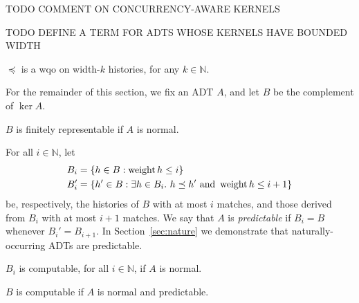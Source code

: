 TODO COMMENT ON CONCURRENCY-AWARE KERNELS

TODO DEFINE A TERM FOR ADTS WHOSE KERNELS HAVE BOUNDED WIDTH

\begin{lemma}

  $\preceq$ is a wqo on width-$k$ histories, for any $k \in \mathbb{N}$.

\end{lemma}

For the remainder of this section, we fix an ADT $A$, and let $B$ be the
complement of $\ker A$.

\begin{lemma}

  $B$ is finitely representable if $A$ is normal.

\end{lemma}

For all $i \in \mathbb{N}$, let
\begin{align*}
  B_i &= {\{{ h \in B : \operatorname{weight} h \le i }\}} \\
  B_i' &= {\{{ h' \in B :
    \exists h \in B_i.\ h \preceq h' \text{ and } \operatorname{weight} h \le i+1
  }\}}
\end{align*}
be, respectively, the histories of $B$ with at most $i$ matches, and those
derived from $B_i$ with at most $i\!+\!1$ matches. We say that $A$ is
\emph{predictable} if $B_i = B$ whenever $B_i' = B_{i+1}$. In 
Section~\ref{sec:nature} we demonstrate that naturally-occurring ADTs are
predictable.

\begin{lemma}

  $B_i$ is computable, for all $i \in \mathbb{N}$, if $A$ is normal.

\end{lemma}

\begin{lemma}

  $B$ is computable if $A$ is normal and predictable.

\end{lemma}
